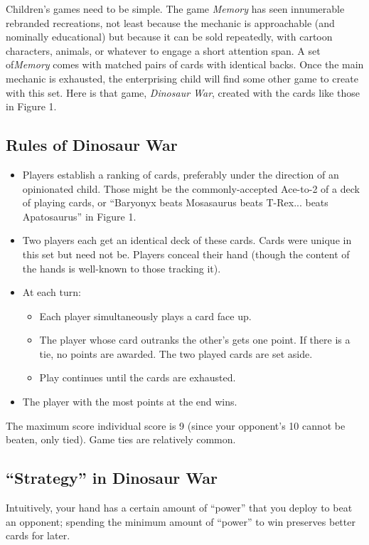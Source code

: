 \documentclass[11pt, oneside]{article} 	%
\begin{document}
Children's games need to be simple. The game \emph{Memory} has seen innumerable rebranded recreations, not least because the mechanic is approachable (and nominally educational) but because it can be sold repeatedly, with cartoon characters, animals, or whatever to engage a short attention span. A set of\emph{Memory} comes with matched pairs of cards with identical backs. Once the main mechanic is exhausted, the enterprising child will find some other game to create with this set. Here is that game, \emph{Dinosaur War}, created with the cards like those in Figure 1.

\subsection{Rules of Dinosaur War}

\begin{itemize} 
\item Players establish a ranking of cards, preferably under the direction of an opinionated child. Those might be the commonly-accepted Ace-to-2 of a deck of playing cards, or ``Baryonyx beats Mosasaurus beats T-Rex... beats Apatosaurus'' in Figure 1.
\item Two players each get an identical deck of these cards. Cards were unique in this set but need not be. Players conceal their hand (though the content of the hands is well-known to those tracking it).
\item At each turn:
\begin{itemize}
\item Each player simultaneously plays a card face up.
\item The player whose card outranks the other's gets one point. If there is a tie, no points are awarded. The two played cards are set aside.
\item Play continues until the cards are exhausted.
\end{itemize}
\item The player with the most points at the end wins.
\end{itemize}

The maximum score individual score is 9 (since your opponent's 10 cannot be beaten, only tied). Game ties are relatively common. 

\subsection{``Strategy'' in Dinosaur War}

Intuitively, your hand has a certain amount of ``power'' that you deploy to beat an opponent; spending the minimum amount of ``power'' to win preserves better cards for later. 
\end{document}
